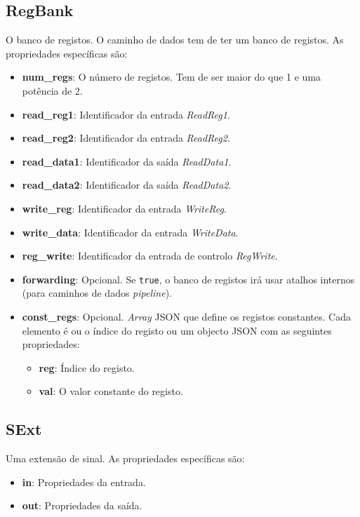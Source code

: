 \documentclass[11pt,a4paper,twoside,titlepage]{report}
\begin{document}
\subsection{RegBank}

O banco de registos. O caminho de dados tem de ter um banco de registos.
As propriedades específicas são:
\begin{itemize}
	\item \textbf{num\_regs}: O número de registos. Tem de ser maior do que 1 e
		uma potência de 2.
	\item \textbf{read\_reg1}: Identificador da entrada \emph{ReadReg1}.
	\item \textbf{read\_reg2}: Identificador da entrada \emph{ReadReg2}.
	\item \textbf{read\_data1}: Identificador da saída \emph{ReadData1}.
	\item \textbf{read\_data2}: Identificador da saída \emph{ReadData2}.
	\item \textbf{write\_reg}: Identificador da entrada \emph{WriteReg}.
	\item \textbf{write\_data}: Identificador da entrada \emph{WriteData}.
	\item \textbf{reg\_write}: Identificador da entrada de controlo \emph{RegWrite}.
	\item \textbf{forwarding}: Opcional. Se \verb+true+, o banco de registos irá
		usar atalhos internos (para caminhos de dados \emph{pipeline}).
	\item \textbf{const\_regs}: Opcional. \emph{Array} JSON que define os registos
		constantes. Cada elemento é ou o índice do registo ou um objecto JSON com
		as seguintes propriedades:
		\begin{itemize}
			\item \textbf{reg}: Índice do registo.
			\item \textbf{val}: O valor constante do registo.
		\end{itemize}
\end{itemize}

\subsection{SExt}

Uma extensão de sinal. As propriedades específicas são:
\begin{itemize}
	\item \textbf{in}: Propriedades da entrada.
	\item \textbf{out}: Propriedades da saída.
\end{itemize}
\end{document}
